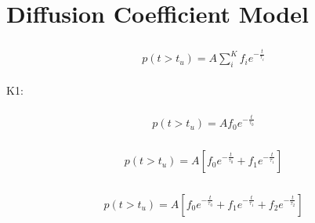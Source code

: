 \documentclass[paper=a4, fontsize=11pt]{scrartcl} %
\numberwithin{equation}{section} %
\numberwithin{figure}{section} %
\numberwithin{table}{section} %
\newcommand{\eqs}[1]{
\begin{align} 
\begin{split}
#1
\end{split}					
\end{align}}
\begin{document}
\section{Diffusion Coefficient Model}

\eqs{ p(t > t_u) = A \sum_{i}^K f_i e^{-\frac{t}{\tau_i} } }

K1:

\eqs{ p(t > t_u) = A f_0 e^{-\frac{t}{\tau_{0}} } }
\eqs{ p(t > t_u) = A [f_0 e^{-\frac{t}{\tau_{0}}} + f_1 e^{-\frac{t}{\tau_{1}}} ] }
\eqs{ p(t > t_u) = A  [f_0 e^{-\frac{t}{\tau_{0}}} + f_1 e^{-\frac{t}{\tau_{1}}}
    + f_2 e^{-\frac{t}{\tau_{2}} } ]}







\end{document}
